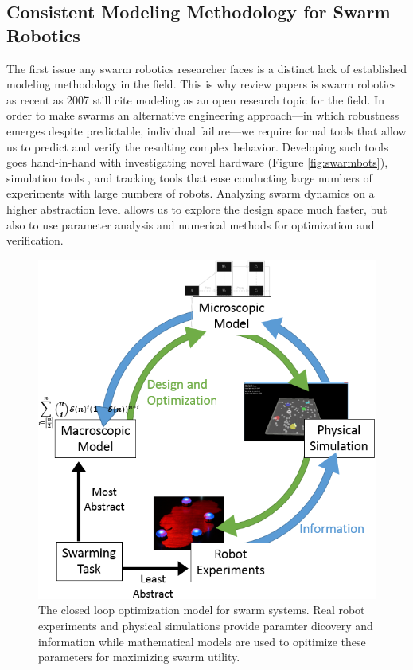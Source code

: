 \documentclass[11pt, onecolumn, compsoc, letterpaper]{article}
\begin{document}
\subsection{Consistent Modeling Methodology for Swarm Robotics}
The first issue any swarm robotics researcher faces is a distinct lack of established modeling methodology in the field.  This is why review papers is swarm robotics as recent as 2007 \cite{Bayindir2007} still cite modeling as an open research topic for the field. In order to make swarms an alternative engineering approach---in which robustness emerges despite predictable, individual failure---we require formal tools that allow us to predict and verify the resulting complex behavior. Developing such tools goes hand-in-hand with investigating novel hardware (Figure \ref{fig:swarmbots}), simulation tools \cite{Michel1998}, and tracking tools \cite{correlliros06,lochmatter08} that ease conducting large numbers of experiments with large numbers of robots. Analyzing swarm dynamics on a higher abstraction level allows us to explore the design space much faster, but also to use parameter analysis and numerical methods for optimization and verification.

\begin{figure}[!htb]
	\centering\includegraphics[width=.75\textwidth]{../assets/ssmodel.png}
	\centering\caption{The closed loop optimization model for swarm systems. Real robot experiments and physical simulations provide paramter dicovery and information while mathematical models are used to opitimize these parameters for maximizing swarm utility.}\label{fig:ssmodel}
\end{figure}
\end{document}
